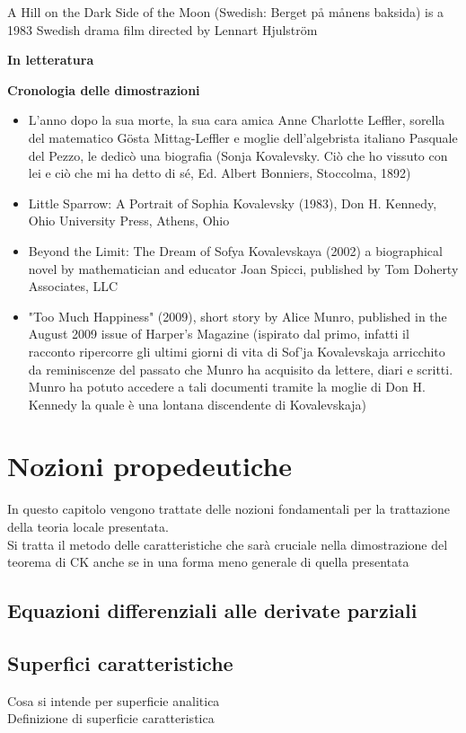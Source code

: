 A Hill on the Dark Side of the Moon (Swedish: Berget på månens baksida) is a 1983 Swedish drama film directed by Lennart Hjulström

\textbf{In letteratura}

\textbf{Cronologia delle dimostrazioni}
\begin{itemize}
\item
L'anno dopo la sua morte, la sua cara amica Anne Charlotte Leffler, sorella del matematico Gösta Mittag-Leffler e moglie dell'algebrista italiano Pasquale del Pezzo, le dedicò una biografia (Sonja Kovalevsky. Ciò che ho vissuto con lei e ciò che mi ha detto di sé, Ed. Albert Bonniers, Stoccolma, 1892)
\item 
Little Sparrow: A Portrait of Sophia Kovalevsky (1983), Don H. Kennedy, Ohio University Press, Athens, Ohio
\item
Beyond the Limit: The Dream of Sofya Kovalevskaya (2002) a biographical novel by mathematician and educator Joan Spicci, published by Tom Doherty Associates, LLC
\item
"Too Much Happiness" (2009), short story by Alice Munro, published in the August 2009 issue of Harper's Magazine (ispirato dal primo, infatti il racconto ripercorre gli ultimi giorni di vita di Sof'ja Kovalevskaja arricchito da reminiscenze del passato che Munro ha acquisito da lettere, diari e scritti. Munro ha potuto accedere a tali documenti tramite la moglie di Don H. Kennedy la quale è una lontana discendente di Kovalevskaja)
\end{itemize}


\chapter{Nozioni propedeutiche}
In questo capitolo vengono trattate delle nozioni fondamentali per la trattazione della teoria locale presentata.\\
Si tratta il metodo delle caratteristiche che sarà cruciale nella dimostrazione del teorema di CK anche se in una forma meno generale di quella presentata

\section{Equazioni differenziali alle derivate parziali}
\section{Superfici caratteristiche}
Cosa si intende per superficie analitica\\
Definizione di superficie caratteristica

